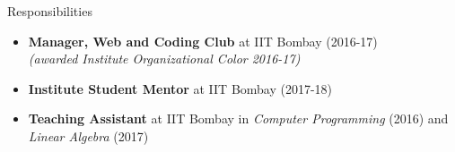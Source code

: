 \documentclass{resume} %
\begin{document}
\begin{rSection}{Responsibilities}
\begin{itemize}[leftmargin=*]
\itemsep -0.5em 
\item \textbf{Manager, Web and Coding Club} at IIT Bombay (2016-17)\\ \textit{(awarded Institute Organizational Color 2016-17)}
\item \textbf{Institute Student Mentor} at IIT Bombay (2017-18)
\item \textbf{Teaching Assistant} at IIT Bombay in \textit{Computer Programming} (2016) and \textit{Linear Algebra} (2017)
\end{itemize}
\end{rSection}
\end{document}
